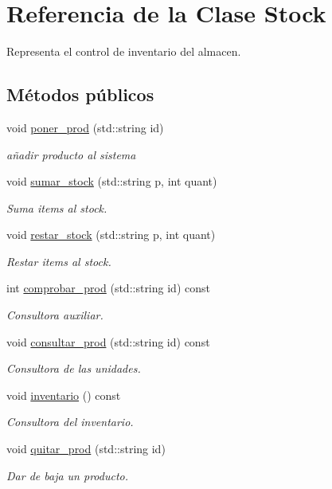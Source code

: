 \hypertarget{class_stock}{}\section{Referencia de la Clase Stock}
\label{class_stock}


Representa el control de inventario del almacen.  


\subsection*{Métodos públicos}
\begin{DoxyCompactItemize}
\item 
void \mbox{\hyperlink{class_stock_a06c7f65bcdd419950fa2c00fd638c03b}{poner\+\_\+prod}} (std\+::string id)
\begin{DoxyCompactList}\small\item\em añadir producto al sistema \end{DoxyCompactList}\item 
void \mbox{\hyperlink{class_stock_a13f036a59415e6b865a3011ecd64d060}{sumar\+\_\+stock}} (std\+::string p, int quant)
\begin{DoxyCompactList}\small\item\em Suma items al stock. \end{DoxyCompactList}\item 
void \mbox{\hyperlink{class_stock_a180a618016e6e6f78c6ca295c0ebfecc}{restar\+\_\+stock}} (std\+::string p, int quant)
\begin{DoxyCompactList}\small\item\em Restar items al stock. \end{DoxyCompactList}\item 
int \mbox{\hyperlink{class_stock_ae1fe35478f2eeae0f91216e7c25e33e6}{comprobar\+\_\+prod}} (std\+::string id) const
\begin{DoxyCompactList}\small\item\em Consultora auxiliar. \end{DoxyCompactList}\item 
void \mbox{\hyperlink{class_stock_aadb2f269b75da29388c0e8b7055b44ce}{consultar\+\_\+prod}} (std\+::string id) const
\begin{DoxyCompactList}\small\item\em Consultora de las unidades. \end{DoxyCompactList}\item 
void \mbox{\hyperlink{class_stock_ab92820b495a64f2a7aef5b071644909a}{inventario}} () const
\begin{DoxyCompactList}\small\item\em Consultora del inventario. \end{DoxyCompactList}\item 
void \mbox{\hyperlink{class_stock_aaa1564711f0e6aa0a8093f53a3dad0b4}{quitar\+\_\+prod}} (std\+::string id)
\begin{DoxyCompactList}\small\item\em Dar de baja un producto. \end{DoxyCompactList}\end{DoxyCompactItemize}
